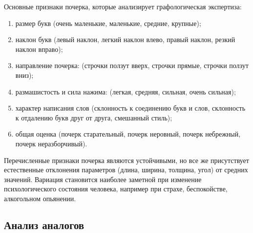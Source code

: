 Основные признаки почерка, которые анализирует графологическая экспертиза:
\begin{enumerate}
  \item размер букв (очень маленькие, маленькие, средние, крупные);
  \item наклон букв (левый наклон, легкий наклон влево, правый наклон, резкий наклон вправо);
  \item направление почерка: (строчки ползут вверх, строчки прямые, строчки ползут вниз);
  \item размашистость и сила нажима: (легкая, средняя, сильная, очень сильная);
  \item характер написания слов (склонность к соединению букв и слов, склонность к отдалению букв друг от друга, смешанный стиль);
  \item общая оценка (почерк старательный, почерк неровный, почерк небрежный, почерк неразборчивый).
\end{enumerate}

Перечисленные признаки почерка являются устойчивыми, но все же присутствует естественные отклонения параметров (длина, ширина, толщина, угол) от средних значений. Вариация становится наиболее заметной при изменение психологического состояния человека, например при страхе, беспокойстве, алкогольном опьянении.

\subsection{Анализ аналогов}
\label{sub:domain:analogs}

